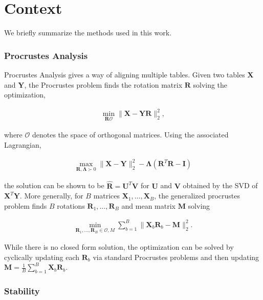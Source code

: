
\section{Context}

We briefly summarize the methods used in this work.

\subsubsection{Procrustes Analysis}
Procrustes Analysis gives a way of aligning multiple tables. Given two tables $\mathbf{X}$ and $\mathbf{Y}$, the Procrustes problem finds the rotation matrix $\mathbf{R}$ solving the optimization,

\begin{align*}
\min_{\mathbf{R} \mathcal{O}} \|\mathbf{X} - \mathbf{Y}\mathbf{R}\|^{2}_{2},
\end{align*}

where $\mathcal{O}$ denotes the space of orthogonal matrices. Using the associated Lagrangian,

\begin{align*}
\max_{\mathbf{R}, \mathbf{\Lambda} \succ 0} \|\mathbf{X} - \mathbf{Y}\|_{2}^{2} - \mathbf{\Lambda}\left(\mathbf{R}^{T}\mathbf{R} - \mathbf{I}\right)
\end{align*}

the solution can be shown to be $\hat{\mathbf{R}} = \mathbf{U}^{T}\mathbf{V}$ for $\mathbf{U}$ and $\mathbf{V}$ obtained by the SVD of $\mathbf{X}^{T}\mathbf{Y}$. More generally, for $B$ matrices $\mathbf{X}_{1}, \dots, \mathbf{X}_{B}$, the generalized procrustes problem finds $B$ rotations $\mathbf{R}_{1}, \dots, \mathbf{R}_{B}$ and mean matrix $\mathbf{M}$ solving

\begin{align*}
\min_{\mathbf{R}_{1}, \dots, \mathbf{R}_{B} \in \mathcal{O}, M} \sum_{b = 1}^{B} \|\mathbf{X}_{b}\mathbf{R}_{b} - \mathbf{M}\|_{2}^{2}.
\end{align*}

While there is no closed form solution, the optimization can be solved by cyclically updating each $\mathbf{R}_{b}$ via standard Procrustes problems and then updating $\mathbf{M} = \frac{1}{B} \sum_{b = 1}^{B} \mathbf{X}_{b} \mathbf{R}_{b}$.

\subsubsection{Stability}

